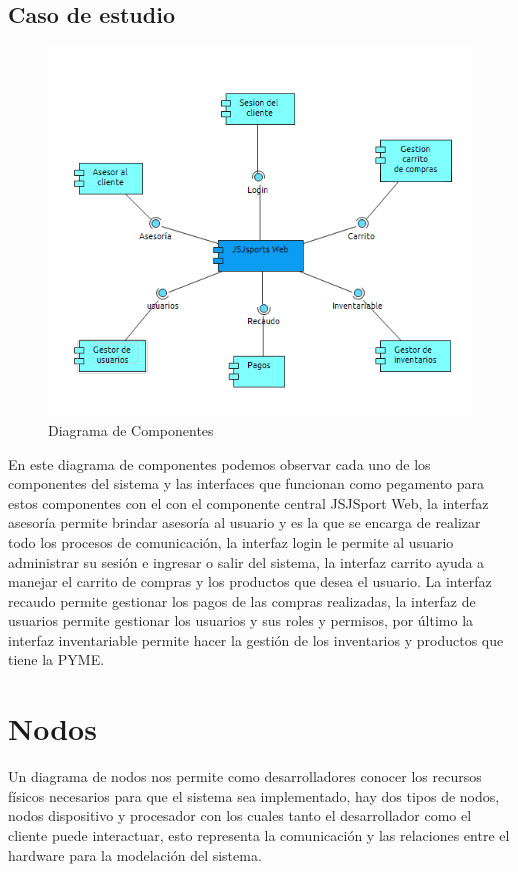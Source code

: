 \subsection*{Caso de estudio}
\begin{figure}[th!]
	\centering
	\includegraphics[width=0.7\linewidth]{arquitectura/imagenes/PuntoVistaEstructuraAplicacion}
	\caption{Diagrama de Componentes}
	\label{fig:componentes}
\end{figure}

En este diagrama de componentes podemos observar cada uno de los componentes del sistema y las interfaces que funcionan como pegamento para estos componentes con el con el componente  central JSJSport Web, la interfaz asesoría permite brindar asesoría al usuario y es la que se encarga de realizar todo los procesos de comunicación, la interfaz login le permite al usuario administrar su sesión e ingresar o salir del sistema, la interfaz carrito ayuda a manejar el carrito de compras y los productos que desea el usuario. La interfaz recaudo permite gestionar los pagos de las compras realizadas, la interfaz de usuarios permite gestionar los usuarios y sus roles y permisos, por último la interfaz inventariable permite hacer la gestión de los inventarios y productos que tiene la PYME.

\newpage

\section{Nodos}
Un diagrama de nodos nos permite como desarrolladores conocer los recursos físicos necesarios para que el sistema sea implementado, hay dos tipos de nodos, nodos dispositivo y procesador con los cuales tanto el desarrollador como el cliente puede interactuar, esto representa la comunicación y las relaciones entre el hardware para la modelación del sistema.


